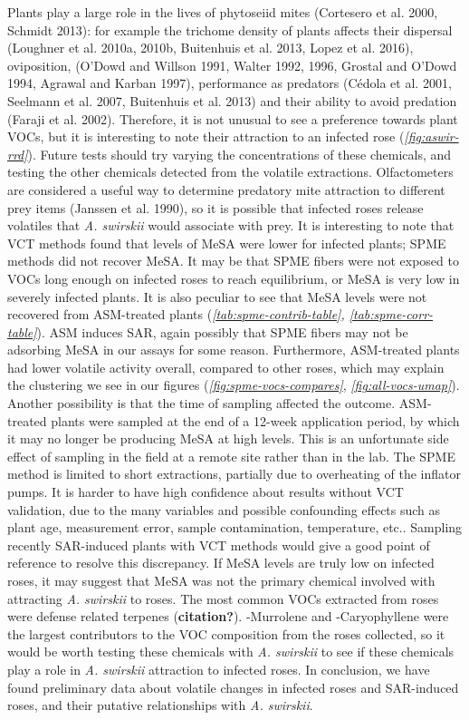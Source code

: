 \documentclass[12pt,final,CPage]{ufthesis}
\begin{document}
{  Plants play a large role in the lives of phytoseiid mites (Cortesero et al. 2000, Schmidt 2013): for example the trichome density of plants affects their dispersal (Loughner et al. 2010a, 2010b, Buitenhuis et al. 2013, Lopez et al. 2016), oviposition, (O'Dowd and Willson 1991, Walter 1992, 1996, Grostal and O'Dowd 1994, Agrawal and Karban 1997), performance as predators (Cédola et al. 2001, Seelmann et al. 2007, Buitenhuis et al. 2013) and their ability to avoid predation (Faraji et al. 2002). Therefore, it is not unusual to see a preference towards plant VOCs, but it is interesting to note their attraction to an infected rose (\emph{\ref{fig:aswir-rrd}}). Future tests should try varying the concentrations of these chemicals, and testing the other chemicals detected from the volatile extractions. Olfactometers are considered a useful way to determine predatory mite attraction to different prey items (Janssen et al. 1990), so it is possible that infected roses release volatiles that \emph{A. swirskii} would associate with prey. It is interesting to note that VCT methods found that levels of MeSA were lower for infected plants; SPME methods did not recover MeSA. It may be that SPME fibers were not exposed to VOCs long enough on infected roses to reach equilibrium, or MeSA is very low in severely infected plants. It is also peculiar to see that MeSA levels were not recovered from ASM-treated plants (\emph{\ref{tab:spme-contrib-table}, \ref{tab:spme-corr-table}}). ASM induces SAR, again possibly that SPME fibers may not be adsorbing MeSA in our assays for some reason. Furthermore, ASM-treated plants had lower volatile activity overall, compared to other roses, which may explain the clustering we see in our figures (\emph{\ref{fig:spme-vocs-compares}}, \emph{\ref{fig:all-vocs-umap}}). Another possibility is that the time of sampling affected the outcome. ASM-treated plants were sampled at the end of a 12-week application period, by which it may no longer be producing MeSA at high levels. This is an unfortunate side effect of sampling in the field at a remote site rather than in the lab. The SPME method is limited to short extractions, partially due to overheating of the inflator pumps. It is harder to have high confidence about results without VCT validation, due to the many variables and possible confounding effects such as plant age, measurement error, sample contamination, temperature, etc.. Sampling recently SAR-induced plants with VCT methods would give a good point of reference to resolve this discrepancy. If MeSA levels are truly low on infected roses, it may suggest that MeSA was not the primary chemical involved with attracting \emph{A. swirskii} to roses. The most common VOCs extracted from roses were defense related terpenes (\textbf{citation?}). \textgamma-Murrolene and \textbeta-Caryophyllene were the largest contributors to the VOC composition from the roses collected, so it would be worth testing these chemicals with \emph{A. swirskii} to see if these chemicals play a role in \emph{A. swirskii} attraction to infected roses. In conclusion, we have found preliminary data about volatile changes in infected roses and SAR-induced roses, and their putative relationships with \emph{A. swirskii}.

}
\end{document}
